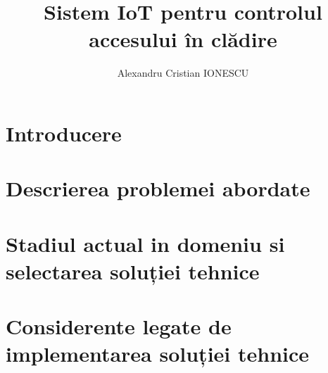 \documentclass[a4paper,12pt]{scrreprt}                       %
\begin{document}

\title{Sistem IoT pentru controlul\\accesului \^{i}n clădire}
\author{Alexandru Cristian IONESCU}

\maketitle


\tableofcontents 
\printglossaries                                       %
\listoffigures 
{}
\listoftables
{}
\listofalgorithmes
{}

\clearpage


\chapter{Introducere}


\chapter{Descrierea problemei abordate}


\chapter{Stadiul actual in domeniu si selectarea soluției tehnice}


\chapter{Considerente legate de implementarea soluției tehnice}

\end{document}
